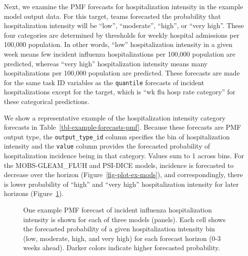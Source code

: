 \documentclass[
]{article}
\begin{document}
Next, we examine the PMF forecasts for hospitalization intensity in the
example model output data. For this target, teams forecasted the
probability that hospitalization intensity will be ``low'',
``moderate'', ``high'', or ``very high''. These four categories are
determined by thresholds for weekly hospital admissions per 100,000
population. In other words, ``low'' hospitalization intensity in a given
week means few incident influenza hospitalizations per 100,000
population are predicted, whereas ``very high'' hospitalization
intensity means many hospitalizations per 100,000 population are
predicted. These forecasts are made for the same task ID variables as
the \texttt{quantile} forecasts of incident hospitalizations except for
the target, which is ``wk flu hosp rate category'' for these categorical
predictions.

We show a representative example of the hospitalization intensity
category forecasts in Table~\ref{tbl-example-forecasts-pmf}. Because
these forecasts are PMF output type, the \texttt{output\_type\_id}
column specifies the bin of hospitalization intensity and the
\texttt{value} column provides the forecasted probability of
hospitalization incidence being in that category. Values sum to 1 across
bins. For the MOBS-GLEAM\_FLUH and PSI-DICE models, incidence is
forecasted to decrease over the horizon (Figure~\ref{fig-plot-ex-mods}),
and correspondingly, there is lower probability of ``high'' and ``very
high'' hospitalization intensity for later horizons
(Figure~\ref{fig-plot-ex-mods-pmf}).

\begin{figure}


\caption{\label{fig-plot-ex-mods-pmf}One example PMF forecast of
incident influenza hospitalization intensity is shown for each of three
models (panels). Each cell shows the forecasted probability of a given
hospitalization intensity bin (low, moderate, high, and very high) for
each forecast horizon (0-3 weeks ahead). Darker colors indicate higher
forecasted probability.}

\end{figure}%
\end{document}
